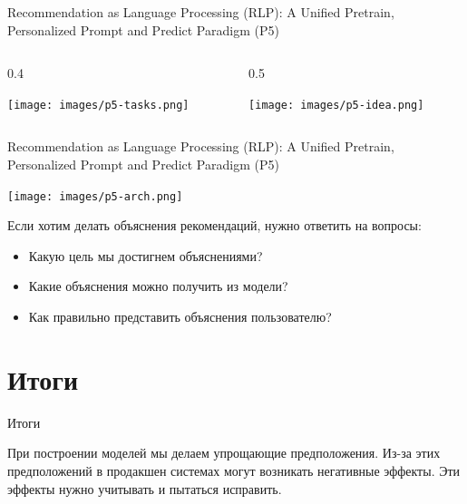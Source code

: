 \documentclass[11pt,aspectratio=169,handout]{beamer}
\begin{document}
\begin{frame}{Recommendation as Language Processing (RLP): A Unified Pretrain, Personalized Prompt and Predict Paradigm (P5) \cite{P5}}

\begin{columns}
\begin{column}{0.4\textwidth}
\begin{center}
\texttt{[image: images/p5-tasks.png]}
\end{center}
\end{column}

\begin{column}{0.5\textwidth}
\begin{center}
\texttt{[image: images/p5-idea.png]}
\end{center}
\end{column}
\end{columns}

\end{frame}

\begin{frame}{Recommendation as Language Processing (RLP): A Unified Pretrain, Personalized Prompt and Predict Paradigm (P5) \cite{P5}}

\begin{center}
\texttt{[image: images/p5-arch.png]}
\end{center}

\end{frame}

\begin{frame}

\begin{tcolorbox}[colback=info!5,colframe=info!80,title=]
Если хотим делать объяснения рекомендаций, нужно ответить на вопросы:
\begin{itemize}
\item Какую цель мы достигнем объяснениями?
\item Какие объяснения можно получить из модели?
\item Как правильно представить объяснения пользователю?
\end{itemize}
\end{tcolorbox}

\end{frame}


\section{Итоги}

\begin{frame}{Итоги}

\begin{tcolorbox}[colback=info!5,colframe=info!80,title=]
При построении моделей мы делаем упрощающие предположения. Из-за этих предположений в продакшен системах могут возникать негативные эффекты. Эти эффекты нужно учитывать и пытаться исправить.
\end{tcolorbox}

\end{frame}
\end{document}
